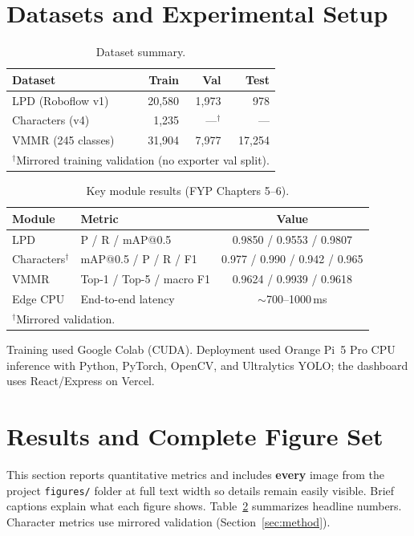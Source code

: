 \documentclass[10pt, conference]{IEEEtran}
\begin{document}
\section{Datasets and Experimental Setup}
\label{sec:data}
\begin{table}[!htbp]
\centering
\caption{Dataset summary.}
\label{tab:data}
\begin{tabular}{@{}lrrr@{}}
\toprule
Dataset & Train & Val & Test \\
\midrule
LPD (Roboflow v1) & 20{,}580 & 1{,}973 & 978 \\
Characters (v4) & 1{,}235 & ---$^\dagger$ & --- \\
VMMR (245 classes) & 31{,}904 & 7{,}977 & 17{,}254 \\
\bottomrule
\multicolumn{4}{l}{\footnotesize $^\dagger$Mirrored training validation (no exporter val split).}
\end{tabular}
\end{table}

\begin{table}[!htbp]
\centering
\caption{Key module results (FYP Chapters 5--6).}
\label{tab:metrics}
\begin{tabular}{@{}llc@{}}
\toprule
Module & Metric & Value \\
\midrule
LPD & P / R / mAP@0.5 & 0.9850 / 0.9553 / 0.9807 \\
Characters$^\dagger$ & mAP@0.5 / P / R / F1 & 0.977 / 0.990 / 0.942 / 0.965 \\
VMMR & Top-1 / Top-5 / macro F1 & 0.9624 / 0.9939 / 0.9618 \\
Edge CPU & End-to-end latency & $\sim$700--1000\,ms \\
\bottomrule
\multicolumn{3}{l}{\footnotesize $^\dagger$Mirrored validation.}
\end{tabular}
\end{table}

Training used Google Colab (CUDA). Deployment used Orange Pi~5 Pro CPU inference with Python, PyTorch, OpenCV, and Ultralytics YOLO; the dashboard uses React/Express on Vercel.

\section{Results and Complete Figure Set}
\label{sec:res}
This section reports quantitative metrics and includes \textbf{every} image from the project \texttt{figures/} folder at full text width so details remain easily visible. Brief captions explain what each figure shows. Table~\ref{tab:metrics} summarizes headline numbers. Character metrics use mirrored validation (Section~\ref{sec:method}).
\end{document}

